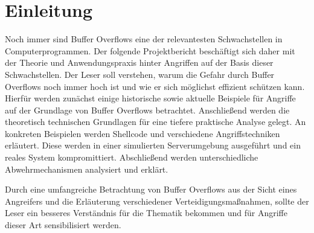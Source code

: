 \section{Einleitung}
Noch immer sind Buffer Overflows eine der relevantesten Schwachstellen in Computerprogrammen.
Der folgende Projektbericht beschäftigt sich daher mit der Theorie und Anwendungspraxis hinter Angriffen auf der Basis dieser Schwachstellen.
Der Leser soll verstehen, warum die Gefahr durch Buffer Overflows noch immer hoch ist und wie er sich möglichst effizient schützen kann.
Hierfür werden zunächst einige historische sowie aktuelle Beispiele für Angriffe auf der Grundlage von Buffer Overflows betrachtet.
Anschließend werden die theoretisch technischen Grundlagen für eine tiefere praktische Analyse gelegt.
An konkreten Beispielen werden Shellcode und verschiedene Angriffstechniken erläutert.
Diese werden in einer simulierten Serverumgebung ausgeführt und ein reales System kompromittiert.
Abschließend werden unterschiedliche Abwehrmechanismen analysiert und erklärt.

Durch eine umfangreiche Betrachtung von Buffer Overflows aus der Sicht eines Angreifers und die Erläuterung verschiedener Verteidigungsmaßnahmen,
sollte der Leser ein besseres Verständnis für die Thematik bekommen und für Angriffe dieser Art sensibilisiert werden.
